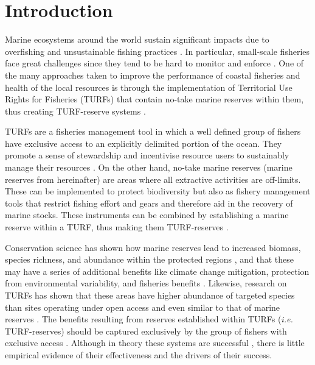 \documentclass{frontiersSCNS}
\begin{document}
\hypertarget{introduction}{%
\section{Introduction}\label{introduction}}

Marine ecosystems around the world sustain significant impacts due to
overfishing and unsustainable fishing practices
\citep{pauly_2005-qV,worm_2006-IB,halpern_2008-dK}. In particular,
small-scale fisheries face great challenges since they tend to be hard
to monitor and enforce \citep{costello_2012}. One of the many approaches
taken to improve the performance of coastal fisheries and health of the
local resources is through the implementation of Territorial Use Rights
for Fisheries (TURFs) that contain no-take marine reserves within them,
thus creating TURF-reserve systems
\citep{afflerbach_2014,gelcich_2015,lester_2017}.

TURFs are a fisheries management tool in which a well defined group of
fishers have exclusive access to an explicitly delimited portion of the
ocean. They promote a sense of stewardship and incentivise resource
users to sustainably manage their resources
\citep{gelcich_2008,costello_2010,mccay_2014}. On the other hand,
no-take marine reserves (marine reserves from hereinafter) are areas
where all extractive activities are off-limits. These can be implemented
to protect biodiversity but also as fishery management tools that
restrict fishing effort and gears and therefore aid in the recovery of
marine stocks. These instruments can be combined by establishing a
marine reserve within a TURF, thus making them TURF-reserves
\citep{afflerbach_2014,gelcich_2015,lester_2017}.

Conservation science has shown how marine reserves lead to increased
biomass, species richness, and abundance within the protected regions
\citep{lester_2009}, and that these may have a series of additional
benefits like climate change mitigation, protection from environmental
variability, and fisheries benefits
\citep{roberts_2017-J9,micheli_2012-EU,krueck_2017-J1}. Likewise,
research on TURFs has shown that these areas have higher abundance of
targeted species than sites operating under open access and even similar
to that of marine reserves \citep{gelcich_2008,gelcich_2012}. The
benefits resulting from reserves established within TURFs (\emph{i.e.}
TURF-reserves) should be captured exclusively by the group of fishers
with exclusive access \citep{gelcich_2015}. Although in theory these
systems are successful \citep{smallhornwest_2018}, there is little
empirical evidence of their effectiveness and the drivers of their
success.
\end{document}
